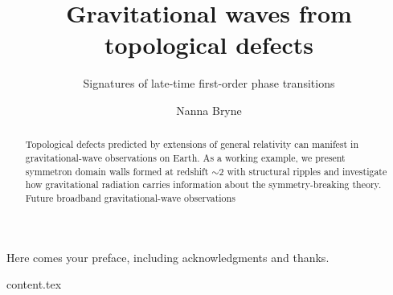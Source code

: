 \documentclass[UKenglish]{texmex/uiomasterthesis}
\title{Gravitational waves from topological defects}
\subtitle{Signatures of late-time first-order phase transitions}
\author{Nanna Bryne}
\begin{document}
% 



\uiomasterfp[
    dept={Institute of Theoretical Astrophysics\and Department of Physics},
    program={Computational Science:~Astrophysics}, 
    supervisor={David Fonseca Mota}, %
    color={blue},
    fgimage={starry-night.png},
    long] 





\frontmatter{}
\begin{abstract}
    Topological defects predicted by extensions of general relativity can manifest in gravitational-wave observations on Earth. As a working example, we present symmetron domain walls formed at redshift $\sim 2$ with structural ripples and investigate how gravitational radiation carries information about the symmetry-breaking theory. Future broadband gravitational-wave observations  
\end{abstract}


\tableofcontents{}
\listoffigures{}     

\begin{preface}
    Here comes your preface, including acknowledgments and thanks.



\end{preface}

\begin{nomen}
    {content.tex}
\end{nomen}





\mainmatter{}


\end{document}
